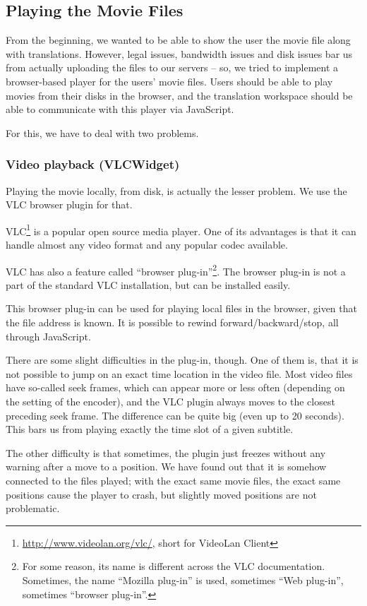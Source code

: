 \subsection{Playing the Movie Files}

From the beginning, we wanted to be able to show the user the movie file along with translations. However, legal issues, bandwidth issues and disk issues bar us from actually uploading the files to our servers -- so, we tried to implement a browser-based player for the users' movie files. Users should be able to play movies from their disks in the browser, and the translation workspace should be able to communicate with this player via JavaScript.

For this, we have to deal with two problems.

\subsubsection*{Video playback (VLCWidget)}

Playing the movie locally, from disk, is actually the lesser problem. We use the VLC browser plugin for that.

VLC\footnote{\url{http://www.videolan.org/vlc/}, short for VideoLan Client} is a popular open source media player. One of its advantages is that it can handle almost any video format and any popular codec available.

VLC has also a feature called ``browser plug-in''\footnote{For some reason, its name is different across the VLC documentation. Sometimes, the name ``Mozilla plug-in'' is used, sometimes ``Web plug-in'', sometimes ``browser plug-in''.}. The browser plug-in is not a part of the standard VLC installation, but can be installed easily.

This browser plug-in can be used for playing local files in the browser, given that the file address is known. It is possible to rewind forward/backward/stop, all through JavaScript.

There are some slight difficulties in the plug-in, though. One of them is, that it is not possible to jump on an exact time location in the video file. Most video files have so-called seek frames, which can appear more or less often (depending on the setting of the encoder), and the VLC plugin always moves to the closest preceding seek frame. The difference can be quite big (even up to 20 seconds). This bars us from playing exactly the time slot of a given subtitle.

The other difficulty is that sometimes, the plugin just freezes without any warning after a move to a position. We have found out that it is somehow connected to the files played; with the exact same movie files, the exact same positions cause the player to crash, but slightly moved positions are not problematic.


